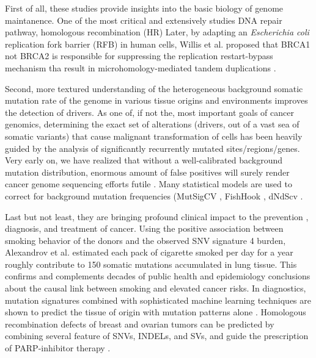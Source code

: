 \documentclass[phd,tocprelim]{cornell}
\begin{document}
First of all, these studies provide insights into the basic biology of genome maintanence. One of the most critical and extensively studies DNA repair pathway, homologous recombination (HR) Later, by adapting an \textit{Escherichia coli} replication fork barrier (RFB) in human cells, Willis et al. proposed that BRCA1 not BRCA2 is responsible for suppressing the replication restart-bypass mechanism tha result in microhomology-mediated tandem duplications \cite{Willis2017-bw}.

Second, more textured understanding of the heterogeneous background somatic mutation rate of the genome in various tissue origins and environments improves the detection of drivers. As one of, if not the, most important goals of cancer genomics, determining the exact set of alterations (drivers, out of a vast sea of somatic variants) that cause malignant transformation of cells has been heavily guided by the analysis of significantly recurrently mutated sites/regions/genes. Very early on, we have realized that without a well-calibrated background mutation distribution, enormous amount of false positives will surely render cancer genome sequencing efforts futile \cite{Getz2007-wf}. Many statistical models are used to correct for background mutation frequencies (MutSigCV \cite{lawrence2013}, FishHook \cite{imielinski2017}, dNdScv \cite{Martincorena2017-yt}.

Last but not least, they are bringing profound clinical impact to the prevention , diagnosis, and treatment of cancer. Using the positive association between smoking behavior of the donors and the observed SNV signature 4 burden, Alexandrov et al. \cite{Alexandrov2016-zs} estimated each pack of cigarette smoked per day for a year roughly contribute to 150 somatic mutations accumulated in lung tissue. This confirms and complements decades of public health and epidemiology conclusions about the causal link between smoking and elevated cancer risks. In diagnostics, mutation signatures combined with sophisticated machine learning techniques are shown to predict the tissue of origin with mutation patterns alone \cite{Jiao2020-le}. Homologous recombination defects of breast and ovarian tumors can be predicted by combining several feature of SNVs, INDELs, and SVs, and guide the prescription of PARP-inhibitor therapy \cite{Davies:2017642}.
\end{document}
